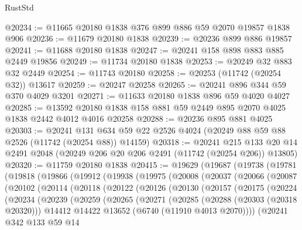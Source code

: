 \begin{lexlean}{RustStd}
\begin{coremodule}
@20234 := @11665 @20180 @1838 @376 @899 @886 @59 @2070 @19857 @1838 @906
@20236 := @11679 @20180 @1838
@20239 := @20236 @899 @886 @19857
@20241 := @11688 @20180 @1838
@20247 := @20241 @158 @898 @883 @885 @2449 @19856
@20249 := @11734 @20180 @1838
@20253 := @20249 @32 @883 @32 @2449
@20254 := @11743 @20180
@20258 := @20253 (@11742 (@20254 @32)) @13617
@20259 := @20247 @20258
@20265 := @20241 @896 @344 @59 @370 @4029 @3201
@20271 := @11633 @20180 @1838 @896 @59 @4020 @4027
@20285 := @13592 @20180 @1838 @158 @881 @59 @2449 @895 @2070 @4025 @1838 @2442 @4012 @4016 @20258
@20288 := @20236 @895 @881 @4025
@20303 := @20241
    @131
    @634
    @59
    @22
    @2526
    @4024
    (@20249 @88 @59 @88 @2526 (@11742 (@20254 @88)) @14159)
@20318 := @20241
    @215
    @133
    @20
    @14
    @2491
    @2048
    (@20249 @206 @20 @206 @2491 (@11742 (@20254 @206)) @13805)
@20320 := @11759 @20180 @1838
@20415 := @19629
    (@19687
      (@19738
        (@19781
          (@19818
            (@19866
              (@19912
                (@19938
                  (@19975
                    (@20008
                      (@20037
                        (@20066
                          (@20087
                            (@20102
                              (@20114
                                (@20118
                                  (@20122
                                    (@20126
                                      (@20130
                                        (@20157
                                          (@20175
                                            (@20224
                                              (@20234
                                                (@20239
                                                  (@20259
                                                    (@20265
                                                      (@20271
                                                        (@20285
                                                          (@20288 (@20303 (@20318 @20320)))
                                                          @14412
                                                          @14422
                                                          @13652
                                                          (@6740 (@11910 @4013 @2070))))
                                                      (@20241
                                                        @342
                                                        @133
                                                        @59
                                                        @14

\end{coremodule}
\end{lexlean}

